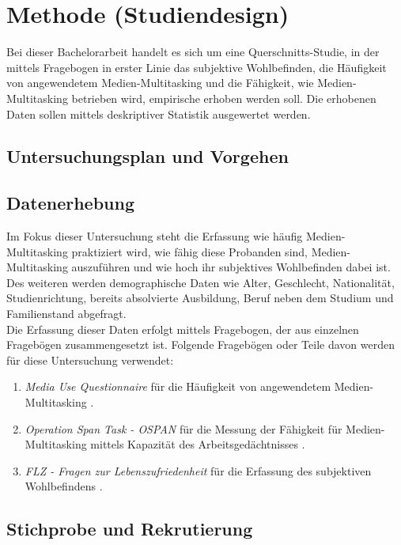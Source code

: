 \section*{Methode (Studiendesign)}\label{section.methode}
Bei dieser Bachelorarbeit handelt es sich um eine Querschnitts-Studie, in der mittels Fragebogen in erster Linie das subjektive Wohlbefinden, die Häufigkeit von angewendetem Medien-Multitasking und die Fähigkeit, wie Medien-Multitasking betrieben wird, empirische erhoben werden soll. Die erhobenen Daten sollen mittels deskriptiver Statistik ausgewertet werden.
\subsection*{Untersuchungsplan und Vorgehen}

\subsection*{Datenerhebung}
Im Fokus dieser Untersuchung steht die Erfassung wie häufig Medien-Multitasking praktiziert wird, wie fähig diese Probanden sind, Medien-Multitasking auszuführen und wie hoch ihr subjektives Wohlbefinden dabei ist. \\ 
Des weiteren werden demographische Daten wie Alter, Geschlecht, Nationalität, Studienrichtung, bereits absolvierte Ausbildung, Beruf neben dem Studium und Familienstand abgefragt.\\
Die Erfassung dieser Daten erfolgt mittels Fragebogen, der aus einzelnen Fragebögen zusammengesetzt ist. Folgende Fragebögen oder Teile davon werden für diese Untersuchung verwendet:
\begin{enumerate}
    \item \textit{Media Use Questionnaire} für die Häufigkeit von angewendetem Medien-Multitasking \cite{Ophir2009}.
    \item \textit{Operation Span Task - OSPAN} für die Messung der Fähigkeit für Medien-Multitasking mittels Kapazität des Arbeitsgedächtnisses \cite{Unsworth2005, Sanbonmatsu2013}.
    \item \textit{FLZ - Fragen zur Lebenszufriedenheit} für die Erfassung des subjektiven Wohlbefindens \cite{Braehler1999}.
\end{enumerate}
\subsection*{Stichprobe und Rekrutierung}

